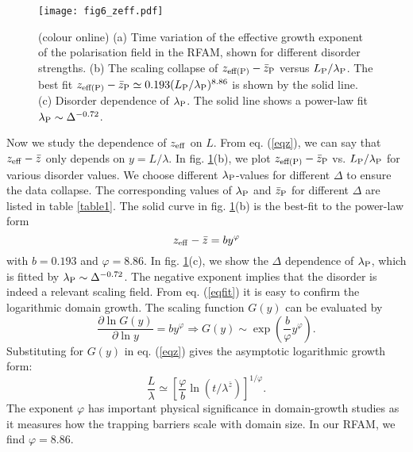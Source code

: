 \documentclass[pre,twocolumn,amssymb,showpacs,superscriptaddress,notitlepage]{revtex4-1}
\begin{document}
\begin{figure}[t]
  \begin{center}
   \texttt{[image: fig6\_zeff.pdf]}
\caption{(colour online)
(a) Time variation of the effective growth exponent of the  polarisation field in 
the RFAM, shown for different disorder strengths.
(b) The scaling collapse of $z_{\rm eff (P)} - \bar z_{\rm  P}$ versus $L_{\rm  P}/\lambda_{\rm  P}$. The best fit 
$z_{\rm eff (P)} - \bar z_{\rm  P} \simeq 
0.193(L_{\rm  P}/\lambda_{\rm  P})^{8.86}$ is shown by the solid line. (c) Disorder dependence of $\lambda_{\rm  P}$. The solid line shows a
power-law fit $\lambda_{\rm  P} \sim \Delta^{-0.72}$.}
\label{fig6}
\end{center}
\end{figure}


Now we study the dependence of $z_{\rm eff}$ on $L$. From eq. (\ref{eqz}), we can say that
$z_{\rm eff}-\bar{z}$ only depends on $y=L/\lambda$. In fig. \ref{fig6}(b), we plot
$z_{\rm eff (P)}-\bar{z}_{\rm  P}$ vs. $L_{\rm  P}/\lambda_{\rm  P}$  for various disorder values. We choose 
different $\lambda_{\rm  P}$-values for different $\Delta$ to ensure the data collapse. 
The corresponding values of $\lambda_{\rm  P}$ and $\bar{z}_{\rm  P}$ for different $\Delta$ are listed in 
table \ref{table1}. The solid curve in  fig. \ref{fig6}(b) is the best-fit to the power-law form
\begin{equation}
z_{\rm eff}-\bar{z} = b y^{\varphi}
\label{eqfit}
\end{equation}
with $b=0.193$ and $\varphi = 8.86$. In fig. \ref{fig6}(c), we show the $\Delta$ dependence of 
 $\lambda_{\rm  P}$, which is fitted by $\lambda_{\rm  P} \sim \Delta^{-0.72}$.
The negative exponent implies that the disorder is indeed  a relevant scaling field.
From eq. (\ref{eqfit}) it is easy to confirm the logarithmic domain growth. The scaling
function $G(y)$ can be evaluated by
\begin{equation}
 \frac{\partial \ln G(y)}{\partial \ln y} = b y^{\varphi} \Rightarrow G(y) \sim \exp\left(\frac{b}{\varphi} y^{\varphi}\right). 
\label{eqgy}
\end{equation}
Substituting for $G(y)$ in eq. (\ref{eqz}) gives the asymptotic logarithmic growth form:
\begin{equation}
\frac{L}{\lambda} \simeq \left[\frac{\varphi}{b}\ln(t/\lambda^{\bar{z}})\right]^{1/\varphi}. 
\label{eql}
\end{equation}
 The exponent $\varphi$ has important physical significance in domain-growth studies as it measures how the 
trapping barriers scale with domain size. In our RFAM, we find $\varphi=8.86$. 
\end{document}
